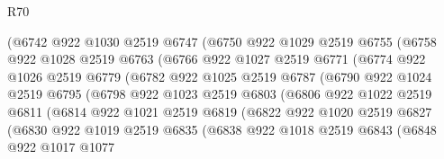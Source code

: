 \begin{lexlean}{R70}
\begin{coremodule}
                  (@6742
                    @922
                    @1030
                    @2519
                    @6747
                    (@6750
                      @922
                      @1029
                      @2519
                      @6755
                      (@6758
                        @922
                        @1028
                        @2519
                        @6763
                        (@6766
                          @922
                          @1027
                          @2519
                          @6771
                          (@6774
                            @922
                            @1026
                            @2519
                            @6779
                            (@6782
                              @922
                              @1025
                              @2519
                              @6787
                              (@6790
                                @922
                                @1024
                                @2519
                                @6795
                                (@6798
                                  @922
                                  @1023
                                  @2519
                                  @6803
                                  (@6806
                                    @922
                                    @1022
                                    @2519
                                    @6811
                                    (@6814
                                      @922
                                      @1021
                                      @2519
                                      @6819
                                      (@6822
                                        @922
                                        @1020
                                        @2519
                                        @6827
                                        (@6830
                                          @922
                                          @1019
                                          @2519
                                          @6835
                                          (@6838
                                            @922
                                            @1018
                                            @2519
                                            @6843
                                            (@6848
                                              @922
                                              @1017
                                              @1077

\end{coremodule}
\end{lexlean}
